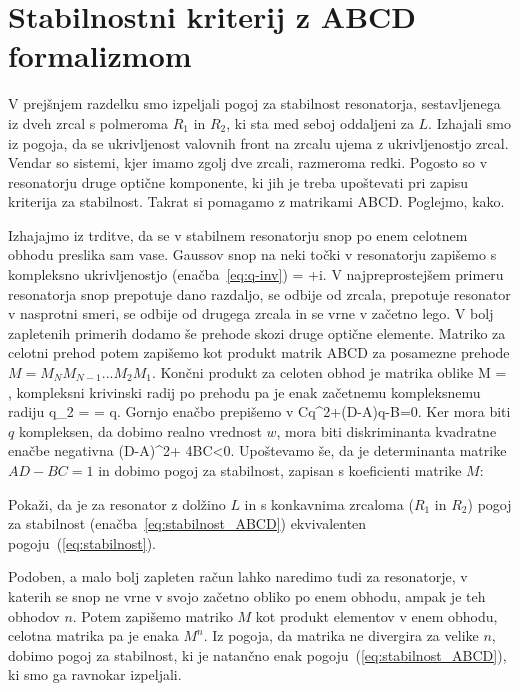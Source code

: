 \section{Stabilnostni kriterij z ABCD formalizmom}
V prejšnjem razdelku smo izpeljali pogoj za stabilnost resonatorja, 
sestavljenega iz dveh zrcal s polmeroma $R_1$ in $R_2$, ki sta med 
seboj oddaljeni za $L$. Izhajali smo iz pogoja, da se ukrivljenost
valovnih front na zrcalu ujema z ukrivljenostjo zrcal. Vendar so sistemi,
kjer imamo zgolj dve zrcali, razmeroma redki. Pogosto so v resonatorju
druge optične komponente, ki jih je treba upoštevati pri zapisu
kriterija za stabilnost. Takrat si pomagamo z matrikami ABCD. Poglejmo, kako.

Izhajajmo iz trditve, da se v stabilnem resonatorju snop po enem celotnem obhodu
preslika sam vase. Gaussov snop na neki točki v resonatorju 
zapišemo s kompleksno ukrivljenostjo (enačba~\ref{eq:q-inv})
\beq
{}= +i.
\eeq
V najpreprostejšem primeru resonatorja snop prepotuje dano razdaljo, se odbije od zrcala, prepotuje
resonator v nasprotni smeri, se odbije od drugega zrcala in se vrne v začetno lego. V bolj 
zapletenih primerih dodamo še prehode skozi druge optične elemente. Matriko 
za celotni prehod potem zapišemo kot produkt matrik ABCD za posamezne prehode $M = M_N M_{N-1} ...M_2 M_1$.
Končni produkt za celoten obhod je matrika oblike
\beq
M = \left[\begin{array}{cc}
A & B\\
C & D
\end{array}\right],
\eeq
kompleksni krivinski radij po prehodu pa je enak začetnemu kompleksnemu radiju
\beq
q_2 =  = q.
\eeq
Gornjo enačbo prepišemo v 
\beq
Cq^2+(D-A)q-B=0.
\eeq
Ker mora biti $q$ kompleksen, da dobimo realno vrednost $w$, mora biti diskriminanta
kvadratne enačbe negativna
\beq
(D-A)^2+ 4BC<0.
\eeq
Upoštevamo še, da je determinanta matrike $AD-BC=1$ in dobimo pogoj za 
stabilnost, zapisan s koeficienti matrike $M$:

\begin{definition}
Pokaži, da je za resonator z dolžino $L$ in s konkavnima zrcaloma ($R_1$ in $R_2$) 
pogoj za stabilnost (enačba~\ref{eq:stabilnost_ABCD}) ekvivalenten pogoju~(\ref{eq:stabilnost}).
\end{definition}

Podoben, a malo bolj zapleten račun lahko naredimo tudi za resonatorje, v katerih se snop 
ne vrne v svojo začetno obliko po enem obhodu, ampak je teh obhodov $n$. Potem zapišemo
matriko $M$ kot produkt elementov v enem obhodu, celotna matrika pa je enaka $M^n$. Iz pogoja,
da matrika ne divergira za velike $n$, dobimo pogoj za stabilnost, ki je natančno 
enak pogoju~(\ref{eq:stabilnost_ABCD}), ki smo ga ravnokar izpeljali. 


